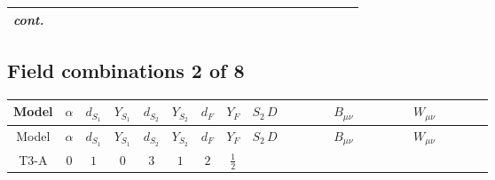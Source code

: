 \documentclass[8pt]{article}
\begin{document}
\begin{landscape}
\begin{longtable}{@{}cccccccc >{\raggedright\arraybackslash}p{0.21\linewidth} >{\raggedright\arraybackslash}p{0.21\linewidth} >{\raggedright\arraybackslash}p{0.21\linewidth}@{}}
\textit{cont.} &  &  &  &  &  &  &  &  &  & \scriptsize\adjustbox{max width=\linewidth}{$\begin{gathered} -\frac{2 \hbar  \overline{y_{2,i_1,r_1}} S_{2,j_3} S_{2,j_4} y_{2,i_1,r_1} S_{2,j_1}{}^{\dagger } S_{2,j_2}{}^{\dagger } \mathcal{I}_{S_2,j_1,j_3,j_2,j_4}{}^2 \lambda_{S_2}^{(1)}^{(2)}}{\sqrt{3} \epsilon } \\ -\frac{\hbar  \overline{y_{2,i_1,r_1}} S_{2,j_3} S_{2,j_4} y_{2,i_1,r_1} S_{2,j_1}{}^{\dagger } S_{2,j_2}{}^{\dagger } \mathcal{I}_{S_2,j_1,j_3,j_2,j_4}{}^2 \lambda_{S_2}^{(1)}^{(2)}}{\sqrt{3}}\end{gathered}$} \\
\midrule
\bottomrule
\end{longtable}
\clearpage
\subsection*{Field combinations 2 of 8}
\begin{longtable}{@{}cccccccc >{\raggedright\arraybackslash}p{0.21\linewidth} >{\raggedright\arraybackslash}p{0.21\linewidth} >{\raggedright\arraybackslash}p{0.21\linewidth}@{}}
\toprule
Model & $\alpha$ & $d_{S_1}$ & $Y_{S_1}$ & $d_{S_2}$ & $Y_{S_2}$ & $d_F$ & $Y_F$ & $S_2\,D$ & $B_{\mu\nu}$ & $W_{\mu\nu}$ \\
\midrule
\endfirsthead
\toprule
Model & $\alpha$ & $d_{S_1}$ & $Y_{S_1}$ & $d_{S_2}$ & $Y_{S_2}$ & $d_F$ & $Y_F$ & $S_2\,D$ & $B_{\mu\nu}$ & $W_{\mu\nu}$ \\
\midrule
\endhead
T3-A & $0$ & $1$ & $0$ & $3$ & $1$ & $2$ & $\frac{1}{2}$ & \scriptsize\adjustbox{max width=\linewidth}{$\begin{gathered} +D_{\mu _1}\left(S_{2,j_1}\right){}^{\dagger } D_{\mu _1}\left(S_{2,j_1}\right)\end{gathered}$} & \scriptsize\adjustbox{max width=\linewidth}{$\begin{gathered} -\frac{\hbar  B_{\mu _1\mu _2}^2}{2 \epsilon }\end{gathered}$} & \scriptsize\adjustbox{max width=\linewidth}{$\begin{gathered} -\frac{\hbar  \left(W_{\mu _1\mu _2}^{A_1}\right){}^2}{2 \epsilon }\end{gathered}$} \\
\midrule
\bottomrule
\end{longtable}
\clearpage

\end{landscape}
\end{document}
